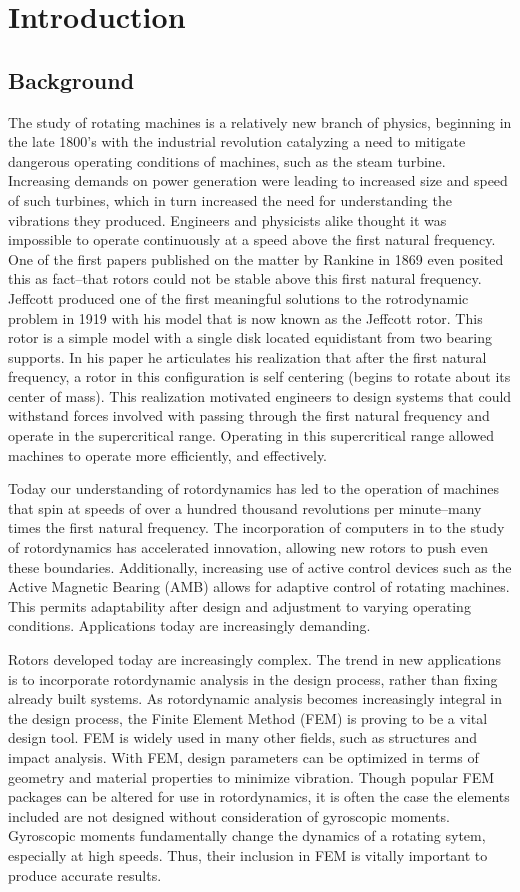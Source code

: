 \chapter{Introduction}
\section{Background} 
The study of rotating machines is a relatively new branch of physics, beginning in the late 1800's with the industrial revolution catalyzing a need to mitigate dangerous operating conditions of machines, such as the steam turbine. Increasing demands on power generation were leading to increased size and speed of such turbines, which in turn increased the need for understanding the vibrations they produced. Engineers and physicists alike thought it was impossible to operate continuously at a speed above the first natural frequency. One of the first papers published on the matter by Rankine in 1869 even posited this as fact--that rotors could not be stable above this first natural frequency. Jeffcott produced one of the first meaningful solutions to the rotrodynamic problem in 1919 with his model that is now known as the Jeffcott rotor. This rotor is a simple model with a single disk located equidistant from two bearing supports. In his paper he articulates his realization that after the first natural frequency, a rotor in this configuration is self centering (begins to rotate about its center of mass). This realization motivated engineers to design systems that could withstand forces involved with passing through the first natural frequency and operate in the supercritical range. Operating in this supercritical range allowed machines to operate more efficiently, and effectively.\par 
Today our understanding of rotordynamics has led to the operation of  machines that spin at speeds of over a hundred thousand revolutions per minute--many times the first natural frequency. The incorporation of computers in to the study of rotordynamics has accelerated innovation, allowing new rotors to push even these boundaries. Additionally, increasing use of active control devices such as the Active Magnetic Bearing (AMB) allows for adaptive control of rotating machines. This permits adaptability after design and adjustment to varying operating conditions. Applications today are increasingly demanding. \par
Rotors developed today are increasingly complex. The trend in new applications is to incorporate rotordynamic analysis in the design process, rather than fixing already built systems. As rotordynamic analysis becomes increasingly integral in the design process, the Finite Element Method (FEM) is proving to be a vital design tool. FEM is widely used in many other fields, such as structures and impact analysis. With FEM, design parameters can be optimized in terms of geometry and material properties to minimize vibration. Though popular FEM packages can be altered for use in rotordynamics, it is often the case the elements included are not designed without consideration of gyroscopic moments. Gyroscopic moments fundamentally change the dynamics of a rotating sytem, especially at high speeds. Thus, their inclusion in FEM is vitally important to produce accurate results.\par 
